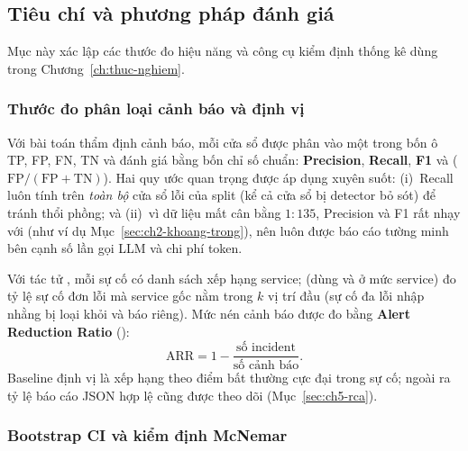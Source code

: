 \subsection{Tiêu chí và phương pháp đánh giá}
\label{sec:ch2-danh-gia}

Mục này xác lập các thước đo hiệu năng và công cụ kiểm định thống kê dùng trong Chương~\ref{ch:thuc-nghiem}.

\subsubsection{Thước đo phân loại cảnh báo và định vị }
\label{sec:ch2-chi-so}
\label{sec:ch2-hitk}

Với bài toán thẩm định cảnh báo, mỗi cửa sổ được phân vào một trong bốn ô TP, FP, FN, TN và đánh giá bằng bốn chỉ số chuẩn: \textbf{Precision}, \textbf{Recall}, \textbf{F1} và \textbf{} ($\mathrm{FP}/(\mathrm{FP}+\mathrm{TN})$). Hai quy ước quan trọng được áp dụng xuyên suốt: (i)~Recall luôn tính trên \emph{toàn bộ} cửa sổ lỗi của split (kể cả cửa sổ bị detector bỏ sót) để tránh thổi phồng; và (ii)~vì dữ liệu mất cân bằng $1:135$, Precision và F1 rất nhạy với  (như ví dụ Mục~\ref{sec:ch2-khoang-trong}), nên  luôn được báo cáo tường minh bên cạnh số lần gọi LLM và chi phí token.

Với tác tử , mỗi sự cố có danh sách xếp hạng service; \textbf{} (dùng  và  ở mức service) đo tỷ lệ sự cố đơn lỗi mà service gốc nằm trong $k$ vị trí đầu (sự cố đa lỗi nhập nhằng bị loại khỏi  và báo riêng). Mức nén cảnh báo được đo bằng \textbf{Alert Reduction Ratio} ():
\begin{equation}
  \mathrm{ARR} = 1 - \frac{\text{số incident}}{\text{số cảnh báo}}.
  \label{eq:ch2-arr}
\end{equation}
Baseline định vị là xếp hạng theo điểm bất thường cực đại trong sự cố; ngoài ra tỷ lệ báo cáo JSON hợp lệ cũng được theo dõi (Mục~\ref{sec:ch5-rca}).

\subsubsection{Bootstrap CI và kiểm định McNemar}
\label{sec:ch2-thong-ke}

